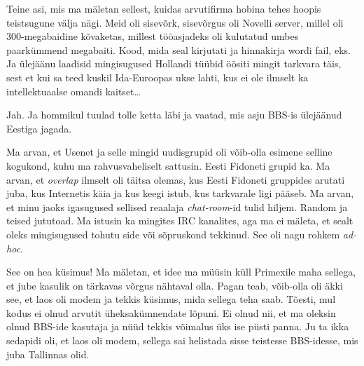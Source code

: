 Teine asi, mis ma mäletan sellest, kuidas arvutifirma hobina tehes hoopis 
teistsugune välja nägi. Meid oli sisevõrk, sisevõrgus oli Novelli server, 
millel oli 300-megabaidine kõvaketas, millest 
tööasjadeks oli kulutatud umbes paarkümmend megabaiti. Kood, mida seal 
kirjutati ja  hinnakirja wordi fail, eks. Ja ülejäänu laadisid 
mingisugused Hollandi tüübid öösiti mingit tarkvara täis, sest et kui sa 
teed kuskil Ida-Euroopas ukse lahti, kus ei ole ilmselt ka intellektuaalse 
omandi kaitset\ldots


Jah. Ja hommikul tuulad tolle ketta läbi ja vaatad, mis asju BBS-is ülejäänud 
Eestiga jagada. 


Ma arvan, et Usenet ja selle mingid uudisgrupid oli võib-olla esimene selline 
kogukond, kuhu ma rahvusvaheliselt sattusin. Eesti Fidoneti grupid ka. Ma 
arvan, et \emph{overlap} ilmselt oli täitsa olemas, kus Eesti Fidoneti 
gruppides arutati juba, kus Internetis käia ja kus keegi istub, kus tarkvarale 
ligi pääseb. Ma arvan, et minu jaoks igasugused sellised reaalaja 
\emph{chat-room}-id tulid hiljem. Random ja teised 
jututoad. Ma istusin ka mingites IRC kanalites, aga ma  ei mäleta, et sealt 
oleks mingisugused tohutu side või sõpruskond tekkinud. See oli nagu rohkem 
\emph{ad-hoc}. 


See on hea küsimus! Ma mäletan, et idee ma müüsin küll Primexile maha sellega, 
et jube kasulik on tärkavas võrgus nähtaval olla. Pagan teab, võib-olla  oli 
äkki see, et laos oli modem ja tekkis küsimus, mida sellega teha saab. 
Tõesti, mul kodus ei olnud arvutit üheksakümnendate lõpuni. Ei olnud nii, et 
ma oleksin olnud BBS-ide kasutaja ja nüüd tekkis võimalus üks ise püsti panna. 
Ju ta ikka sedapidi oli, et laos oli modem, sellega sai helistada sisse 
teistesse BBS-idesse, mis juba Tallinnas olid.

